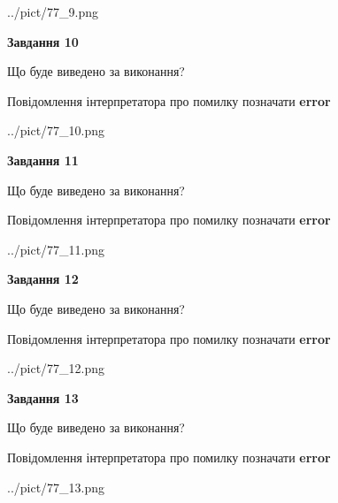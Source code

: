 \documentclass[11pt, ukrainian]{article}
\begin{document}
{\begin {large}
\begin{center}
	{../pict/77_9.png}
\end{center}
\newpage

{\begin {center}\textbf{Завдання 10}\end {center}}\par
Що буде виведено за виконання? \par
Повідомлення інтерпретатора про помилку позначати \textbf{error}

\begin{center}
	{../pict/77_10.png}
\end{center}
\newpage

{\begin {center}\textbf{Завдання 11}\end {center}}\par
Що буде виведено за виконання? \par
Повідомлення інтерпретатора про помилку позначати \textbf{error}

\begin{center}
	{../pict/77_11.png}
\end{center}
\newpage

{\begin {center}\textbf{Завдання 12}\end {center}}\par
Що буде виведено за виконання? \par
Повідомлення інтерпретатора про помилку позначати \textbf{error}

\begin{center}
	{../pict/77_12.png}
\end{center}
\newpage

{\begin {center}\textbf{Завдання 13}\end {center}}\par
Що буде виведено за виконання? \par
Повідомлення інтерпретатора про помилку позначати \textbf{error}

\begin{center}
	{../pict/77_13.png}
\end{center}
\newpage


\end{large}}
\end{document}
